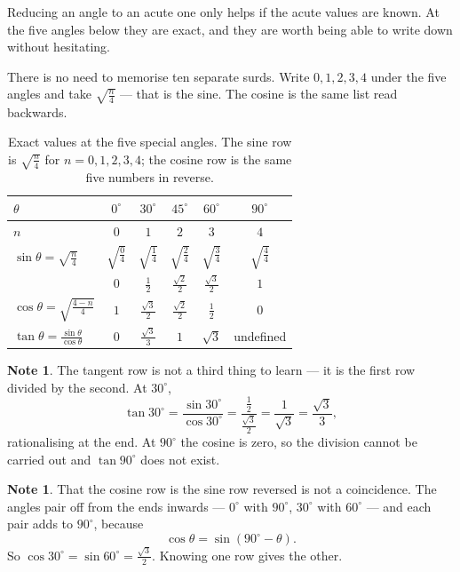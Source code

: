 \documentclass[11pt,a4paper]{article}
\theoremstyle{definition}
\newtheorem{note}[thm]{Note}
\begin{document}
Reducing an angle to an acute one only helps if the acute values are known. At the five
angles below they are exact, and they are worth being able to write down without
hesitating.

There is no need to memorise ten separate surds. Write $0,1,2,3,4$ under the five
angles and take $\sqrt{\frac{n}{4}}$ --- that is the sine. The cosine is the same list
read backwards.

\begin{table}[H]
\centering
\begin{tabular}{|l|c|c|c|c|c|}
\hline
$\theta$ & $0^\circ$ & $30^\circ$ & $45^\circ$ & $60^\circ$ & $90^\circ$\\
\hline
$n$ & $0$ & $1$ & $2$ & $3$ & $4$\\
\hline
$\sin\theta=\sqrt{\frac{n}{4}}$ & $\sqrt{\frac{0}{4}}$ & $\sqrt{\frac{1}{4}}$
 & $\sqrt{\frac{2}{4}}$ & $\sqrt{\frac{3}{4}}$ & $\sqrt{\frac{4}{4}}$\\
 & $0$ & $\frac{1}{2}$ & $\frac{\sqrt{2}}{2}$ & $\frac{\sqrt{3}}{2}$ & $1$\\
\hline
$\cos\theta=\sqrt{\frac{4-n}{4}}$ & $1$ & $\frac{\sqrt{3}}{2}$ & $\frac{\sqrt{2}}{2}$
 & $\frac{1}{2}$ & $0$\\
\hline
$\tan\theta=\frac{\sin\theta}{\cos\theta}$ & $0$ & $\frac{\sqrt{3}}{3}$ & $1$
 & $\sqrt{3}$ & undefined\\
\hline
\end{tabular}
\caption{Exact values at the five special angles. The sine row is $\sqrt{\frac{n}{4}}$ for $n=0,1,2,3,4$; the cosine row is the same five numbers in reverse.}
\end{table}

\begin{note}
The tangent row is not a third thing to learn --- it is the first row divided by the
second. At $30^\circ$,
$$\tan 30^\circ=\frac{\sin 30^\circ}{\cos 30^\circ}
=\frac{\frac{1}{2}}{\frac{\sqrt{3}}{2}}=\frac{1}{\sqrt{3}}=\frac{\sqrt{3}}{3},$$
rationalising at the end. At $90^\circ$ the cosine is zero, so the division cannot be
carried out and $\tan 90^\circ$ does not exist.
\end{note}

\begin{note}
That the cosine row is the sine row reversed is not a coincidence. The angles pair off
from the ends inwards --- $0^\circ$ with $90^\circ$, $30^\circ$ with $60^\circ$ ---
and each pair adds to $90^\circ$, because
$$\cos\theta=\sin\left(90^\circ-\theta\right).$$
So $\cos 30^\circ=\sin 60^\circ=\frac{\sqrt{3}}{2}$. Knowing one row gives the other.
\end{note}
\end{document}
